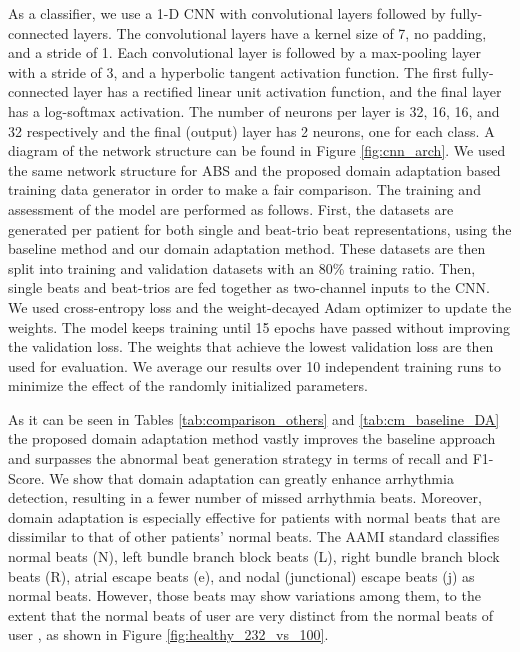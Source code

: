 \documentclass[journal,transmag]{IEEEtran}
\begin{document}
As a classifier, we use a 1-D CNN with  convolutional layers followed by  fully-connected layers. The convolutional layers have a kernel size of 7, no padding, and a stride of 1. Each convolutional layer is followed by a max-pooling layer with a stride of 3, and a hyperbolic tangent activation function. The first fully-connected layer has a rectified linear unit activation function, and the final layer has a log-softmax activation. The number of neurons per layer is 32, 16, 16, and 32 respectively and the final (output) layer has 2 neurons, one for each class. A diagram of the network structure can be found in Figure \ref{fig:cnn_arch}. We used the same network structure for ABS and the proposed domain adaptation based training data generator in order to make a fair comparison. The training and assessment of the model are performed as follows. First, the datasets are generated per patient for both single and beat-trio beat representations, using the baseline method and our domain adaptation method. These datasets are then split into training and validation datasets with an 80\% training ratio. Then, single beats and beat-trios are fed together as two-channel inputs to the CNN. We used cross-entropy loss and the weight-decayed Adam optimizer \cite{adamW} to update the weights. The model keeps training until 15 epochs have passed without improving the validation loss. The weights that achieve the lowest validation loss are then used for evaluation. We average our results over 10 independent training runs to minimize the effect of the randomly initialized parameters.

As it can be seen in Tables \ref{tab:comparison_others} and \ref{tab:cm_baseline_DA} the proposed domain adaptation method vastly improves the baseline approach and surpasses the abnormal beat generation strategy in terms of recall and F1-Score. We show that domain adaptation can greatly enhance arrhythmia detection, resulting in a fewer number of missed arrhythmia beats. Moreover, domain adaptation is especially effective for patients with normal beats that are dissimilar to that of other patients' normal beats. The AAMI standard classifies normal beats (N), left bundle branch block beats (L), right bundle branch block beats (R), atrial escape beats (e), and nodal (junctional) escape beats (j) as normal beats. However, those beats may show variations among them, to the extent that the normal beats of user  are very distinct from the normal beats of user , as shown in Figure \ref{fig:healthy_232_vs_100}.
\end{document}
